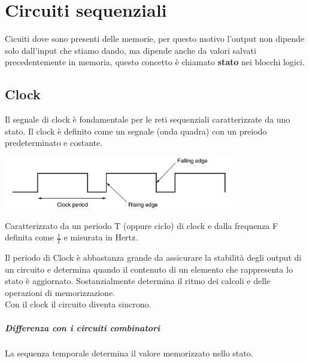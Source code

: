 \documentclass[12pt, a4paper, openany]{book}
\begin{document}
\chapter{Circuiti sequenziali}
Cicuiti dove sono presenti delle memorie, per questo motivo l'output non dipende
solo dall'input che stiamo dando, ma dipende anche da valori salvati precedentemente in memoria,
questo concetto è chiamato \textbf{stato} nei blocchi logici.

\section{Clock}
Il segnale di clock è fondamentale per le reti sequenziali caratterizzate da uno stato.
Il clock è definito come un segnale (onda quadra) con un preiodo predeterminato e costante.
\begin{center}
    \includegraphics[width=100mm, scale=0.5]{clock_rappresentazione.png}
\end{center}
Caratterizzato da un periodo T (oppure ciclo) di clock e dalla frequenza F definita come
$\frac{1}{T}$ e misurata in Hertz.

Il periodo di Clock è abbastanza grande da assicurare la stabilità degli output di un circuito
e determina quando il contenuto di un elemento che rappresenta lo stato è aggiornato.
Sostanzialmente determina il ritmo dei calcoli e delle operazioni di memorizzazione.
\\ Con il clock il circuito diventa sincrono.

\paragraph{Differenza con i circuiti combinatori} La sequenza temporale determina il valore
memorizzato nello stato.

\end{document}
